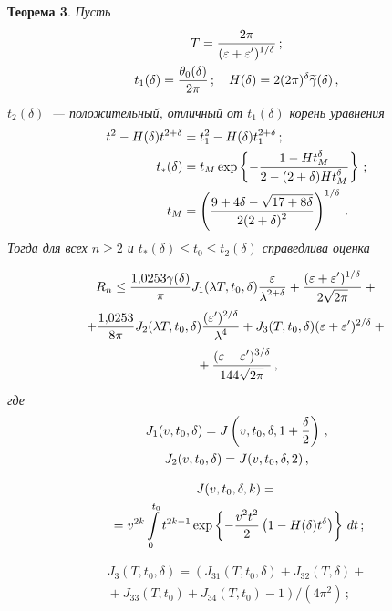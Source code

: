 \begin{multicols}{2}
\noindent
\textbf{Теорема 3}.
\textit{Пусть
\begin{gather*}
T=\fr{2\pi}{(\eps+\eps')^{1/\delta}}\,;\\
t_1(\delta)=
\fr{\theta_0(\delta)}{2\pi}\,;\quad
H(\delta)=2(2\pi)^{\delta}\widetilde{\gamma}(\delta)\,,
\end{gather*}
$t_2(\delta)$~--- положительный, отличный от $t_1(\delta)$ корень уравнения
\begin{align*}
t^2-H(\delta)t^{2+\delta}&=t_1^2-H(\delta)t_1^{2+\delta}\,;
\\
t_*(\delta)&=
t_M\exp\left\{-\fr{1-Ht_M^{\delta}}{2-(2+\delta)Ht_M^{\delta}}\right\}\,;\\
t_M&=\left(\fr{9+4\delta -\sqrt{17+8\delta}}{2(2+\delta)^2}\right)^{1/\delta}\,.
\end{align*}
Тогда для всех $n\ge2$ и ${t_*(\delta)\le t_0\le t_2(\delta)}$
справедлива оценка}

\noindent
\begin{multline*}
R_n\le \fr{1{,}0253\gamma(\delta)}{\pi} J_1(\lambda T,t_0,\delta)
\fr{\eps}{\lambda^{2+\delta}} +
\fr{(\eps+\eps')^{1/\delta}}{2\sqrt{2\pi}}+{}\\
+ \fr{1{,}0253}{8\pi}J_2(\lambda T,t_0,\delta)
\fr{(\eps')^{2/\delta}}{\lambda^4}+ J_3(T,t_0,\delta) (\eps+\eps')^{2/\delta}+{}\\
{}+
\fr{(\eps+\eps')^{3/\delta}}{144\sqrt{2\pi}}\,,
\end{multline*}
\textit{где}
\begin{gather*}
J_1(v,t_0,\delta)=J\left(v,t_0,\delta,1+\fr{\delta}{2}\right)\,,\\
 J_2(v,t_0,\delta)= J(v,t_0,\delta,2)\,,
\end{gather*}

\vspace*{-12pt}

\noindent
\begin{multline*}
J(v,t_0,\delta,k)={}\\
{}= v^{2k}\int\limits_0^{t_0} t^{2k-1}
\exp\left\{-\fr{v^2t^2}2\left(1-H(\delta)t^{\delta}\right) \right\} \,dt\,;
\end{multline*}

\vspace*{-12pt}

\noindent
\begin{multline*}
J_3(T,t_0,\delta)=
\left (J_{31}(T,t_0,\delta)+
J_{32}(T,\delta)+{}\right.\\
\left.{}+J_{33}(T,t_0)+J_{34}(T,t_0)-1\right )\Big/
(4\pi^2)\,;
\end{multline*}


\end{multicols}
